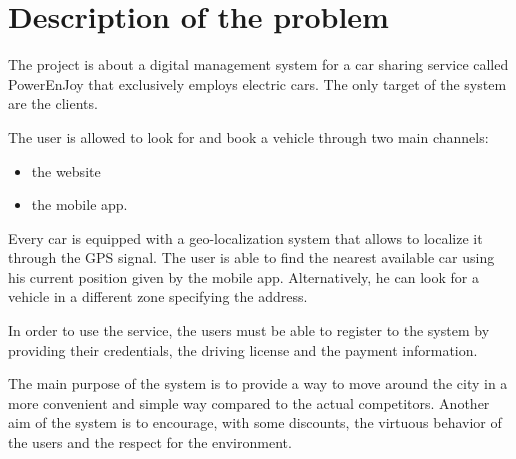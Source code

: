\section{Description of the problem}
The project is about a digital management system for a car sharing service called PowerEnJoy that exclusively employs electric cars. The only target of the system are the clients.
 
The user is allowed to look for and book a vehicle through two main channels:
\begin{itemize}
	\item the website
	\item the mobile app.
\end{itemize}

Every car is equipped with a geo-localization system that allows to localize it through the GPS signal.
The user is able to find the nearest available car using his current position given by the mobile app.
Alternatively, he can look for a vehicle in a different zone specifying the address.

In order to use the service, the users must be able to register to the system by providing their credentials, the driving license and the payment information.


The main purpose of the system is to provide a way to move around the city in a more convenient and simple way compared to the actual competitors. Another aim of the system is to encourage, with some discounts, the virtuous behavior of the users and the respect for the environment.